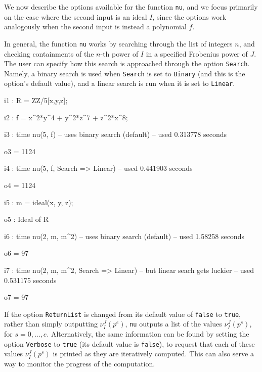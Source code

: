 \documentclass{amsart}
\begin{document}

We now describe the options available for the function {\tt nu}, and we focus primarily on the case where the second input is an ideal $I$, since the options work analogously when the second input is instead a polynomial $f$.

In general, the function {\tt nu} works by searching through the list of integers $n$, and checking containments of the $n$-th power of $I$ in a specified Frobenius power of $J$.
The user can specify how this search is approached through the  option {\tt Search}.  Namely, a binary search is used when {\tt Search} is set to {\tt Binary} (and this is the option's default value), and a linear search is run when it is set to {\tt Linear}.

{\small
{}
\begin{MyVerbatim}

i1 : R = ZZ/5[x,y,z];

i2 : f = x^2*y^4 + y^2*z^7 + z^2*x^8;

i3 : time nu(5, f) -- uses binary search (default)
     -- used 0.313778 seconds

o3 = 1124

i4 : time nu(5, f, Search => Linear)
     -- used 0.441903 seconds

o4 = 1124

i5 : m = ideal(x, y, z);

o5 : Ideal of R

i6 : time nu(2, m, m^2) -- uses binary search (default)
     -- used 1.58258 seconds

o6 = 97

i7 : time nu(2, m, m^2, Search => Linear) -- but linear seach gets luckier
     -- used 0.531175 seconds

o7 = 97
\end{MyVerbatim}
}
\medspace



If the option {\tt ReturnList} is changed from its default value of {\tt false} to {\tt true}, rather than simply outputting $\nu_I^J(p^e)$, {\tt nu} outputs a list of the values $\nu_I^J(p^s)$, for $s=0,\ldots,e$.
Alternatively, the same information can be found by setting the option {\tt Verbose} to {\tt true} (its default value is {\tt false}), to request that each of these values $\nu_I^J(p^s)$ is printed as they are iteratively computed.  This can also serve a way to monitor the progress of the computation.
\end{document}
